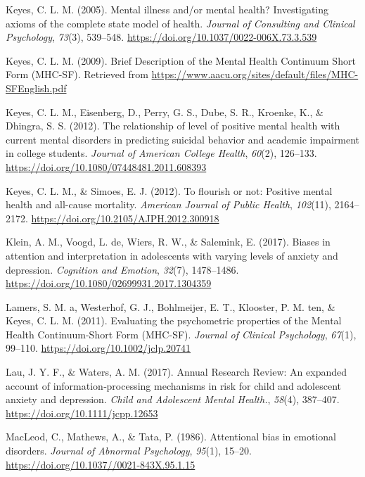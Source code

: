 \documentclass[
  english,
  man,floatsintext]{apa6}
\begin{document}
\leavevmode\hypertarget{ref-Keyes2005}{}%
Keyes, C. L. M. (2005). Mental illness and/or mental health? Investigating axioms of the complete state model of health. \emph{Journal of Consulting and Clinical Psychology}, \emph{73}(3), 539--548. \url{https://doi.org/10.1037/0022-006X.73.3.539}

\leavevmode\hypertarget{ref-Keyes2009}{}%
Keyes, C. L. M. (2009). Brief Description of the Mental Health Continuum Short Form (MHC-SF). Retrieved from \url{https://www.aacu.org/sites/default/files/MHC-SFEnglish.pdf}

\leavevmode\hypertarget{ref-Keyes2012a}{}%
Keyes, C. L. M., Eisenberg, D., Perry, G. S., Dube, S. R., Kroenke, K., \& Dhingra, S. S. (2012). The relationship of level of positive mental health with current mental disorders in predicting suicidal behavior and academic impairment in college students. \emph{Journal of American College Health}, \emph{60}(2), 126--133. \url{https://doi.org/10.1080/07448481.2011.608393}

\leavevmode\hypertarget{ref-Keyes2012}{}%
Keyes, C. L. M., \& Simoes, E. J. (2012). To flourish or not: Positive mental health and all-cause mortality. \emph{American Journal of Public Health}, \emph{102}(11), 2164--2172. \url{https://doi.org/10.2105/AJPH.2012.300918}

\leavevmode\hypertarget{ref-klein_biases_2017}{}%
Klein, A. M., Voogd, L. de, Wiers, R. W., \& Salemink, E. (2017). Biases in attention and interpretation in adolescents with varying levels of anxiety and depression. \emph{Cognition and Emotion}, \emph{32}(7), 1478--1486. \url{https://doi.org/10.1080/02699931.2017.1304359}

\leavevmode\hypertarget{ref-Lamers2011}{}%
Lamers, S. M. a, Westerhof, G. J., Bohlmeijer, E. T., Klooster, P. M. ten, \& Keyes, C. L. M. (2011). Evaluating the psychometric properties of the Mental Health Continuum-Short Form (MHC-SF). \emph{Journal of Clinical Psychology}, \emph{67}(1), 99--110. \url{https://doi.org/10.1002/jclp.20741}

\leavevmode\hypertarget{ref-lau_annual_2017}{}%
Lau, J. Y. F., \& Waters, A. M. (2017). Annual Research Review: An expanded account of information‐processing mechanisms in risk for child and adolescent anxiety and depression. \emph{Child and Adolescent Mental Health.}, \emph{58}(4), 387--407. \url{https://doi.org/10.1111/jcpp.12653}

\leavevmode\hypertarget{ref-MacLeod1986}{}%
MacLeod, C., Mathews, A., \& Tata, P. (1986). Attentional bias in emotional disorders. \emph{Journal of Abnormal Psychology}, \emph{95}(1), 15--20. \url{https://doi.org/10.1037//0021-843X.95.1.15}
\end{document}
